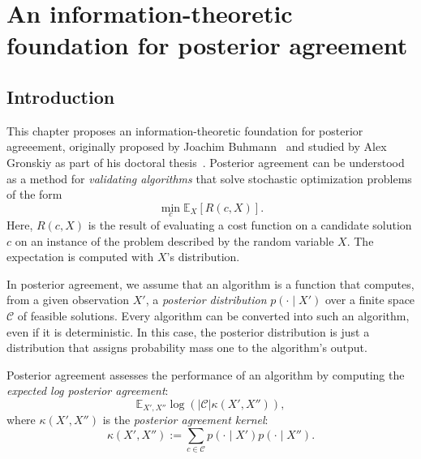 \chapter{An information-theoretic foundation for posterior agreement}

\newtheorem{objective}{Objective}

%
%
%

\section{Introduction}

This chapter proposes an information-theoretic foundation for posterior agreeement, originally proposed by Joachim Buhmann~\cite{buhmann2010information} and studied by Alex Gronskiy as part of his doctoral thesis~\cite{gronskiy2018statistical}. 
Posterior agreement can be understood as a method for \emph{validating algorithms} that solve stochastic optimization problems of the form
%
$$\min_{c} \mathbb{E}_X\left[R(c, X)\right].$$
% 
Here, $R(c, X)$ is the result of evaluating a cost function on a candidate solution $c$ on an instance of the problem described by the random variable $X$. The expectation is computed with $X$'s distribution.

In posterior agreement, we assume that an algorithm is a function that computes, from a given observation $X'$, a \emph{posterior distribution} $p(\cdot \mid X')$ over a finite space $\mathcal{C}$ of feasible solutions. Every algorithm can be converted into such an algorithm, even if it is deterministic. In this case, the posterior distribution is just a distribution that assigns probability mass one to the algorithm's output.

Posterior agreement assesses the performance of an algorithm by computing the \emph{expected log posterior agreement}:
%
\begin{equation}
\mathbb{E}_{X', X''} \log \left(\left|\mathcal{C}\right|\kappa\left(X', X''\right)\right),
\label{eq:overview_exp_log_post_agr}
\end{equation}
%
where $\kappa\left(X', X''\right)$ is the \emph{posterior agreement kernel}:
%
$$\kappa\left(X', X''\right) := \sum_{c \in \mathcal{C}} p(\cdot \mid X')p(\cdot \mid X'').$$

